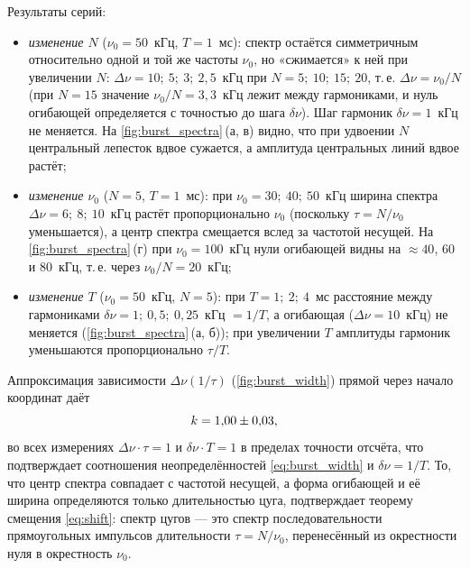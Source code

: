 \documentclass[a4paper,12pt]{article}
\begin{document}
Результаты серий:
\begin{itemize}
    \item \emph{изменение $N$} ($\nu_0 = 50$~кГц, $T = 1$~мс): спектр
          остаётся симметричным относительно одной и той же частоты
          $\nu_0$, но «сжимается» к ней при увеличении $N$:
          $\Delta\nu = 10;\ 5;\ 3;\ 2{,}5$~кГц при $N = 5;\ 10;\ 15;\ 20$,
          т.\,е. $\Delta\nu = \nu_0/N$ (при $N = 15$ значение
          $\nu_0/N = 3{,}3$~кГц лежит между гармониками, и нуль огибающей
          определяется с точностью до шага $\delta\nu$). Шаг гармоник $\delta\nu = 1$~кГц не
          меняется. На \cref{fig:burst_spectra}\,(а, в) видно, что при
          удвоении $N$ центральный лепесток вдвое сужается, а амплитуда
          центральных линий вдвое растёт;
    \item \emph{изменение $\nu_0$} ($N = 5$, $T = 1$~мс): при
          $\nu_0 = 30;\ 40;\ 50$~кГц ширина спектра $\Delta\nu = 6;\ 8;\
          10$~кГц растёт пропорционально $\nu_0$ (поскольку
          $\tau = N/\nu_0$ уменьшается), а центр спектра смещается вслед за
          частотой несущей. На \cref{fig:burst_spectra}\,(г) при
          $\nu_0 = 100$~кГц нули огибающей видны на $\approx40$, $60$ и
          $80$~кГц, т.\,е. через $\nu_0/N = 20$~кГц;
    \item \emph{изменение $T$} ($\nu_0 = 50$~кГц, $N = 5$): при
          $T = 1;\ 2;\ 4$~мс расстояние между гармониками
          $\delta\nu = 1;\ 0{,}5;\ 0{,}25$~кГц $= 1/T$, а огибающая
          ($\Delta\nu = 10$~кГц) не меняется
          (\cref{fig:burst_spectra}\,(а, б)); при увеличении $T$ амплитуды
          гармоник уменьшаются пропорционально $\tau/T$.
\end{itemize}

Аппроксимация зависимости $\Delta\nu(1/\tau)$ (\cref{fig:burst_width})
прямой через начало координат даёт
\begin{equation}
    k = 1{,}00 \pm 0{,}03,
\end{equation}
во всех измерениях $\Delta\nu\cdot\tau = 1$ и $\delta\nu\cdot T = 1$ в
пределах точности отсчёта, что подтверждает соотношения
неопределённостей \cref{eq:burst_width} и $\delta\nu = 1/T$. То, что центр
спектра совпадает с частотой несущей, а форма огибающей и её ширина
определяются только длительностью цуга, подтверждает теорему смещения
\cref{eq:shift}: спектр цугов --- это спектр последовательности
прямоугольных импульсов длительности $\tau = N/\nu_0$, перенесённый из
окрестности нуля в окрестность $\nu_0$.

\clearpage
\end{document}

